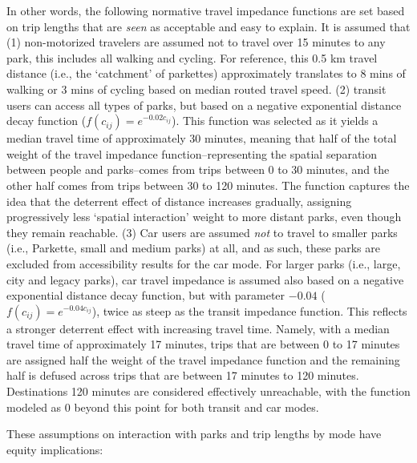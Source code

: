 \documentclass[
11pt, %
oneside, %
english, %
singlespacing, %
]{macthesis} %
\begin{document}
In other words, the following normative travel impedance functions are set based on trip lengths that are \emph{seen} as acceptable and easy to explain. It is assumed that (1) non-motorized travelers are assumed not to travel over 15 minutes to any park, this includes all walking and cycling. For reference, this 0.5 km travel distance (i.e., the `catchment' of parkettes) approximately translates to 8 mins of walking or 3 mins of cycling based on median routed travel speed. (2) transit users can access all types of parks, but based on a negative exponential distance decay function (\(f(c_{ij}) = e^{-0.02c_{ij}}\)). This function was selected as it yields a median travel time of approximately 30 minutes, meaning that half of the total weight of the travel impedance function--representing the spatial separation between people and parks--comes from trips between 0 to 30 minutes, and the other half comes from trips between 30 to 120 minutes. The function captures the idea that the deterrent effect of distance increases gradually, assigning progressively less `spatial interaction' weight to more distant parks, even though they remain reachable. (3) Car users are assumed \emph{not} to travel to smaller parks (i.e., Parkette, small and medium parks) at all, and as such, these parks are excluded from accessibility results for the car mode. For larger parks (i.e., large, city and legacy parks), car travel impedance is assumed also based on a negative exponential distance decay function, but with parameter \(-0.04\) (\(f(c_{ij}) = e^{-0.04c_{ij}}\)), twice as steep as the transit impedance function. This reflects a stronger deterrent effect with increasing travel time. Namely, with a median travel time of approximately 17 minutes, trips that are between 0 to 17 minutes are assigned half the weight of the travel impedance function and the remaining half is defused across trips that are between 17 minutes to 120 minutes. Destinations 120 minutes are considered effectively unreachable, with the function modeled as 0 beyond this point for both transit and car modes.

These assumptions on interaction with parks and trip lengths by mode have equity implications:
\end{document}
